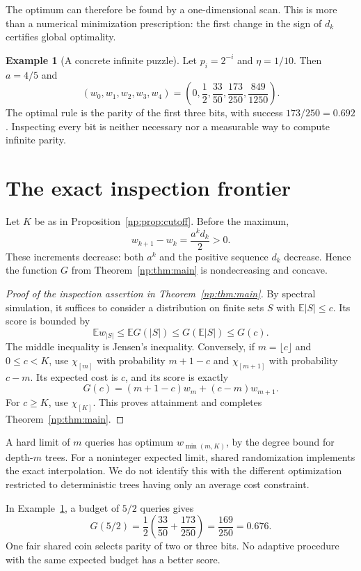 \documentclass[11pt,a4paper]{article}
\theoremstyle{definition}
\newtheorem{example}[theorem]{Example}
\theoremstyle{remark}
\newcommand{\E}{\mathbb E}
\begin{document}
The optimum can therefore be found by a one-dimensional scan. This is
more than a numerical minimization prescription: the first change in
the sign of \(d_k\) certifies global optimality.

\begin{example}[A concrete infinite puzzle]\label{np:ex:dyadic}
Let \(p_i=2^{-i}\) and \(\eta=1/10\). Then \(a=4/5\) and
\[
 (w_0,w_1,w_2,w_3,w_4)
 =\left(0,\frac12,\frac{33}{50},
 \frac{173}{250},\frac{849}{1250}\right).
\]
The optimal rule is the parity of the first three bits, with success
\(173/250=0.692\). Inspecting every bit is neither necessary nor a
measurable way to compute infinite parity.
\end{example}

\section{The exact inspection frontier}\label{np:sec:budget}

Let \(K\) be as in Proposition~\ref{np:prop:cutoff}. Before the maximum,
\[
 w_{k+1}-w_k=\frac{a^k d_k}{2}>0.
\]
These increments decrease: both \(a^k\) and the positive sequence \(d_k\)
decrease. Hence the function \(G\) from Theorem~\ref{np:thm:main} is
nondecreasing and concave.

\begin{proof}[Proof of the inspection assertion in Theorem~\ref{np:thm:main}]
By spectral simulation, it suffices to consider a distribution on finite
sets \(S\) with \(\E|S|\le c\). Its score is bounded by
\[
 \E w_{|S|}\le \E G(|S|)
 \le G(\E|S|)\le G(c).
\]
The middle inequality is Jensen's inequality. Conversely, if \(m=\lfloor c\rfloor\)
and \(0\le c<K\), use \(\chi_{[m]}\) with probability \(m+1-c\) and
\(\chi_{[m+1]}\) with probability \(c-m\). Its expected cost is \(c\),
and its score is exactly
\[
 G(c)=(m+1-c)w_m+(c-m)w_{m+1}.
\]
For \(c\ge K\), use \(\chi_{[K]}\). This proves attainment and completes
Theorem~\ref{np:thm:main}.
\end{proof}

A hard limit of \(m\) queries has optimum \(w_{\min(m,K)}\), by the
degree bound for depth-\(m\) trees. For a noninteger expected limit,
shared randomization implements the exact interpolation. We do not
identify this with the different optimization restricted to deterministic
trees having only an average cost constraint.

In Example~\ref{np:ex:dyadic}, a budget of \(5/2\) queries gives
\[
 G(5/2)=\frac12\left(\frac{33}{50}+\frac{173}{250}\right)
 =\frac{169}{250}=0.676.
\]
One fair shared coin selects parity of two or three bits. No adaptive
procedure with the same expected budget has a better score.
\end{document}
